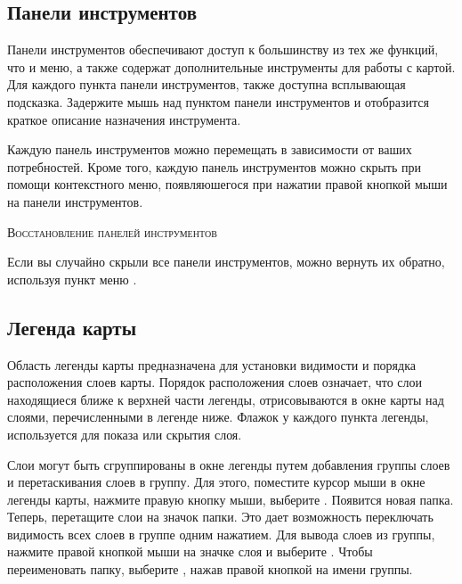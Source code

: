 
\subsection{Панели инструментов}\label{label_toolbars}

Панели инструментов обеспечивают доступ к большинству из тех же функций,
что и меню, а также содержат дополнительные инструменты для работы с
картой. Для каждого пункта панели инструментов, также доступна всплывающая
подсказка. Задержите мышь над пунктом панели инструментов и отобразится
краткое описание назначения инструмента.

Каждую панель инструментов можно перемещать в зависимости от ваших
потребностей. Кроме того, каждую панель инструментов можно скрыть при
помощи контекстного меню, появляюшегося при нажатии правой кнопкой мыши
на панели инструментов.

\begin{Tip}
\caption{\textsc{Восстановление панелей инструментов}} 
Если вы случайно скрыли все панели инструментов, можно вернуть их обратно,
используя пункт меню  \arrow {}.
\end{Tip}

\subsection{Легенда карты}\label{label_legend}

Область легенды карты предназначена для установки видимости и порядка
расположения слоев карты. Порядок расположения слоев означает, что слои
находящиеся ближе к верхней части легенды, отрисовываются в окне карты
над слоями, перечисленными в легенде ниже. Флажок у каждого пункта
легенды, используется для показа или скрытия слоя.

Слои могут быть сгруппированы в окне легенды путем добавления группы слоев
и перетаскивания слоев в группу. Для этого, поместите курсор мыши в окне
легенды карты, нажмите правую кнопку мыши, выберите
. Появится новая папка. Теперь, перетащите
слои на значок папки. Это дает возможность переключать видимость всех
слоев в группе одним нажатием. Для вывода слоев из группы, нажмите правой
кнопкой мыши на значке слоя и выберите
. Чтобы переименовать
папку, выберите , нажав правой кнопкой на
имени группы.


